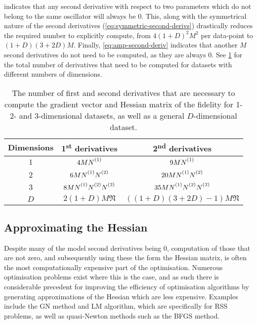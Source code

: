  indicates that any second derivative
with respect to two parameters which do not belong to the same oscillator will
always be $0$. This, along with the symmetrical nature of the second
derivatives (\cref{eq:symmetric-second-derivs}) drastically reduces the
required number to explicitly compute, from $4 (1 + D)^2 M^2$ per data-point
to  $(1+D)\left(3 + 2D\right)M$. Finally, \cref{eq:amp-second-deriv}
indicates that another $M$ second derivatives do not need to be computed, as
they are always $0$. See \cref{tab:number-of-derivatives} for the total
number of derivatives that need to be computed for datasets with different
numbers of dimensions.
\begin{table}
    \begin{center}
        \begin{tabular}{ c c c }
            \toprule
            Dimensions &
                \raisebox{\depth}{\#} 1\textsuperscript{st} derivatives &
                \raisebox{\depth}{\#} 2\textsuperscript{nd} derivatives\\
            \midrule
            $1$ & $4M\None$ & $9M\None$\\
            $2$ & $6M\None\Ntwo$ & $20M\None\Ntwo$\\
            $3$ & $8M\None\Ntwo\Nthree$ & $35M\None\Ntwo\Nthree$\\
            $D$ &  $2(1 + D)M \mathfrak{N}$ &  $((1 + D)(3 + 2D) - 1)M \mathfrak{N}$\\
            \bottomrule
        \end{tabular}
    \end{center}
    \caption{
        The number of first and second derivatives that are necessary to
        compute the gradient vector and Hessian matrix of the fidelity for
        1- 2- and 3-dimensional datasets, as well as a general $D$-dimensional
        dataset.
    }
    \label{tab:number-of-derivatives}
\end{table}

\subsection{Approximating the Hessian}
Despite many of the model second derivatives being $0$, computation of those
that are not zero, and subsequently using these the form the Hessian matrix, is
often the most computationally expensive part of the optimisation.
Numerous optimisation problems exist where this is the case, and as such
there is considerable precedent for improving the efficiency of optimisation
algorithms by generating approximations of the Hessian which are less expensive.
Examples include the \ac{GN} method and \ac{LM} algorithm,
which are specifically for \ac{RSS} problems\cite[Chapter
10]{Nocedal2006}, as well as quasi-Newton methods such as the \ac{BFGS}
method\cite[Chapter 6]{Nocedal2006}.

